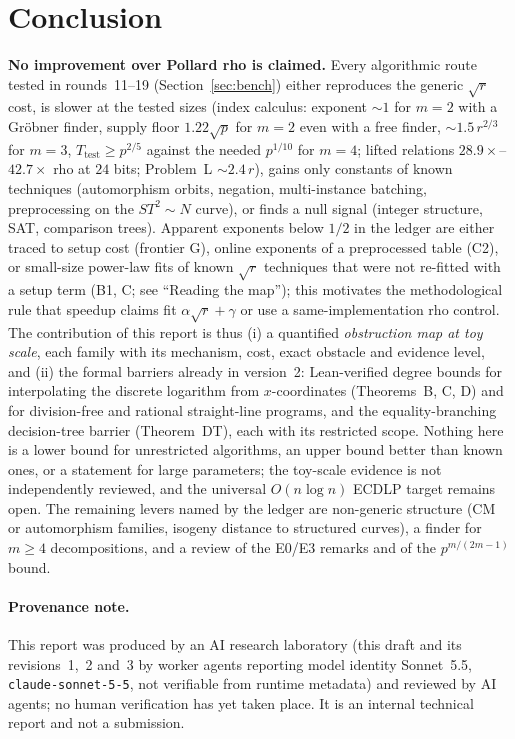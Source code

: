 \documentclass[11pt,a4paper]{article}
\theoremstyle{remark}
\begin{document}
\section{Conclusion}\label{sec:concl}
\textbf{No improvement over Pollard rho is claimed.} Every algorithmic route tested in rounds~11--19 (Section~\ref{sec:bench}) either reproduces the generic $\sqrt r$ cost, is slower at the tested sizes (index calculus: exponent $\sim1$ for $m=2$ with a Gr\"obner finder, supply floor $1.22\sqrt p$ for $m=2$ even with a free finder, $\sim1.5\,r^{2/3}$ for $m=3$, $T_{\mathrm{test}}\ge p^{2/5}$ against the needed $p^{1/10}$ for $m=4$; lifted relations $28.9\times$--$42.7\times$ rho at $24$ bits; Problem~L $\sim2.4\,r$), gains only constants of known techniques (automorphism orbits, negation, multi-instance batching, preprocessing on the $ST^2\sim N$ curve), or finds a null signal (integer structure, SAT, comparison trees). Apparent exponents below $1/2$ in the ledger are either traced to setup cost (frontier G), online exponents of a preprocessed table (C2), or small-size power-law fits of known $\sqrt r$ techniques that were not re-fitted with a setup term (B1, C; see ``Reading the map''); this motivates the methodological rule that speedup claims fit $\alpha\sqrt r+\gamma$ or use a same-implementation rho control.
The contribution of this report is thus (i) a quantified \emph{obstruction map at toy scale}, each family with its mechanism, cost, exact obstacle and evidence level, and (ii) the formal barriers already in version~2: Lean-verified degree bounds for interpolating the discrete logarithm from $x$-coordinates (Theorems~B, C, D) and for division-free and rational straight-line programs, and the equality-branching decision-tree barrier (Theorem~DT), each with its restricted scope. Nothing here is a lower bound for unrestricted algorithms, an upper bound better than known ones, or a statement for large parameters; the toy-scale evidence is not independently reviewed, and the universal $O(n\log n)$ ECDLP target remains open. The remaining levers named by the ledger are non-generic structure (CM or automorphism families, isogeny distance to structured curves), a finder for $m\ge4$ decompositions, and a review of the E0/E3 remarks and of the $p^{m/(2m-1)}$ bound.

\paragraph{Provenance note.} This report was produced by an AI research laboratory (this draft and its revisions~1,~2 and~3 by worker agents reporting model identity Sonnet~5.5, \texttt{claude-sonnet-5-5}, not verifiable from runtime metadata) and reviewed by AI agents; no human verification has yet taken place.
It is an internal technical report and not a submission.



\end{document}
